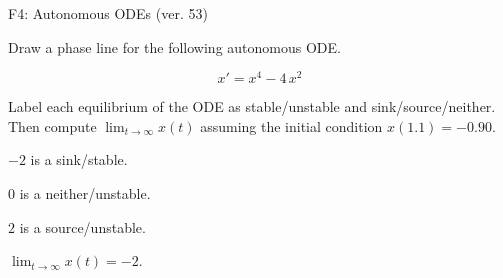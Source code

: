 \begin{exercise}
  \begin{exerciseTitle}F4: Autonomous ODEs (ver. 53)\end{exerciseTitle}
  \begin{exerciseStatement}
    

      Draw a phase line for the following 
      autonomous ODE.
    

    
\[x'= x^{4} - 4 \, x^{2}\]

    

      Label each equilibrium of the ODE
      as stable/unstable and sink/source/neither.
      Then compute \(\lim_{t\to\infty}x(t)\)
      assuming the initial condition
      \(x( 1.1 )= -0.90\).
    

  \end{exerciseStatement}
  \begin{exerciseAnswer}
    

      \(-2\) is a sink/stable.
      
        \(0\) is a neither/unstable.
      
      \(2\) is a source/unstable.
    

    

      \(\lim_{t\to\infty}x(t)=-2\).
    

  \end{exerciseAnswer}
\end{exercise}